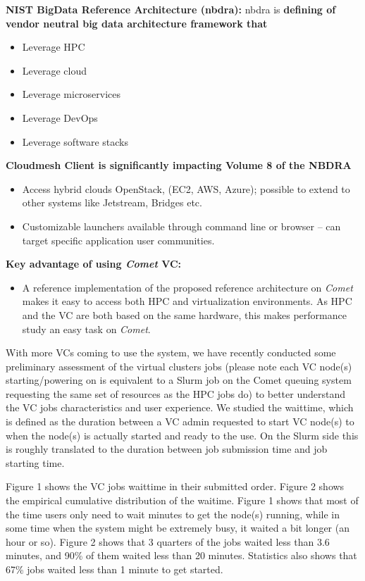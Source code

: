 \textbf{NIST BigData Reference Architecture (nbdra):} nbdra is
\textbf{defining of vendor neutral big data architecture framework that}

\begin{itemize}
\item
  Leverage HPC
\item
  Leverage cloud
\item
  Leverage microservices
\item
  Leverage DevOps
\item
  Leverage software stacks
\end{itemize}

\textbf{Cloudmesh Client is significantly impacting Volume 8 of the
NBDRA}

\begin{itemize}
\item
  Access hybrid clouds OpenStack, (EC2, AWS, Azure); possible to extend
  to other systems like Jetstream, Bridges etc.
\item
  Customizable launchers available through command line or browser --
  can target specific application user communities.
\end{itemize}

\textbf{Key advantage of using \emph{Comet} VC:}

\begin{itemize}
\item
  A reference implementation of the proposed reference architecture on
  \emph{Comet} makes it easy to access both HPC and virtualization
  environments. As HPC and the VC are both based on the same hardware,
  this makes performance study an easy task on \emph{Comet}.
\end{itemize}

With more VCs coming to use the system, we have recently conducted some
preliminary assessment of the virtual clusters jobs (please note each VC
node(s) starting/powering on is equivalent to a Slurm job on the Comet
queuing system requesting the same set of resources as the HPC jobs do)
to better understand the VC jobs characteristics and user experience. We
studied the waittime, which is defined as the duration between a VC
admin requested to start VC node(s) to when the node(s) is actually
started and ready to the use. On the Slurm side this is roughly
translated to the duration between job submission time and job starting
time.

Figure 1 shows the VC jobs waittime in their submitted order. Figure 2
shows the empirical cumulative distribution of the waitime. Figure 1
shows that most of the time users only need to wait minutes to get the
node(s) running, while in some time when the system might be extremely
busy, it waited a bit longer (an hour or so). Figure 2 shows that 3
quarters of the jobs waited less than 3.6 minutes, and 90\% of them
waited less than 20 minutes. Statistics also shows that 67\% jobs waited
less than 1 minute to get started.

